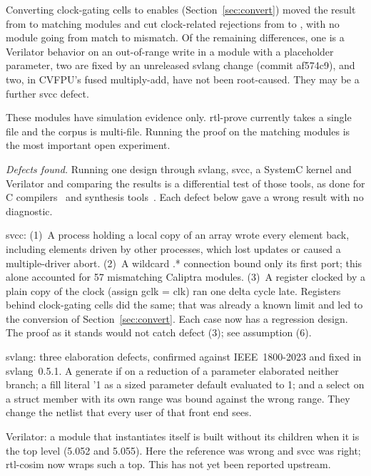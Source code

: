 \documentclass[conference]{IEEEtran}
\newcommand{\code}[1]{{\fontshape{n}\ttfamily #1}}
\begin{document}
Converting clock-gating cells to enables (Section~\ref{sec:convert}) moved the result from
\nMatchBeforeCG{} to \nMatch{} matching modules and cut clock-related rejections from
\nClockRejBefore{} to \nClockRejAfter{}, with no module going from match to mismatch. Of the
\nMismatch{} remaining differences, one is a Verilator behavior on an out-of-range write in a
module with a placeholder parameter, two are fixed by an unreleased \code{svlang} change
(commit \code{af574c9}), and two, in CVFPU's fused multiply-add, have not been root-caused. They may
be a further \code{svcc} defect.

These modules have simulation evidence only. \code{rtl-prove} currently takes a single file and
the corpus is multi-file. Running the proof on the \nMatch{} matching modules is the most important
open experiment.

\emph{Defects found.}
\label{sec:defects}
Running one design through \code{svlang}, \code{svcc}, a SystemC kernel and Verilator and comparing
the results is a differential test of those tools, as done for C
compilers~\cite{yang2011csmith} and synthesis tools~\cite{herklotz2020verismith}. Each defect
below gave a wrong result with no diagnostic.

\code{svcc}: (1)~A process holding a local copy of an array wrote every element back, including
elements driven by other processes, which lost updates or caused a multiple-driver abort. (2)~A
wildcard \code{.*} connection bound only its first port; this alone accounted for 57 mismatching
Caliptra modules. (3)~A register clocked by a plain copy of the clock (\code{assign gclk = clk}) ran
one delta cycle late. Registers behind clock-gating cells did the same; that was already a known
limit and led to the conversion of Section~\ref{sec:convert}. Each case now has a regression design.
The proof as it stands would not catch defect (3); see assumption (6).

\code{svlang}: three elaboration defects, confirmed against IEEE~1800-2023 and fixed in
\code{svlang}~0.5.1. A generate \code{if} on a reduction of a parameter elaborated neither branch;
a fill literal \code{'1} as a sized parameter default evaluated to 1; and a select on a struct member
with its own range was bound against the wrong range. They change the netlist that every user of
that front end sees.

Verilator: a module that instantiates itself is built without its children when it is the top
level (5.052 and 5.055). Here the reference was wrong and \code{svcc} was right; \code{rtl-cosim}
now wraps such a top. This has not yet been reported upstream.
\end{document}
